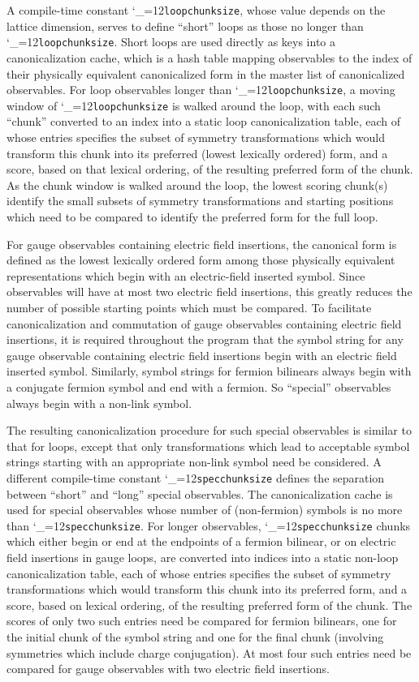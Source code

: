 \documentclass [12pt]{article}
\makeatletter
\renewcommand{\tt}{\begingroup\catcode`_=12\def\_{\string_}\tt@}
\newcommand{\tt@}[1]{\texttt{#1}\endgroup}
\makeatother
\begin{document}
A compile-time constant \tt{loopchunksize},
whose value depends on the lattice dimension,
serves to define ``short'' loops as those no longer
than \tt{loopchunksize}.
Short loops are used directly as keys into
a canonicalization cache, which is a hash
table mapping observables to the index
of their physically equivalent canonicalized
form in the master list of canonicalized observables.
For loop observables longer than \tt{loopchunksize},
a moving window of \tt{loopchunksize} is walked around
the loop, with each such ``chunk'' converted to an
index into a static loop canonicalization table,
each of whose entries specifies the subset of
symmetry transformations which would transform
this chunk into its preferred (lowest lexically ordered)
form, and a score, based on that lexical ordering, of
the resulting preferred form of the chunk.
As the chunk window is walked around the loop,
the lowest scoring chunk(s) identify the 
small subsets of symmetry transformations
and starting positions which
need to be compared to identify the preferred
form for the full loop.

For gauge observables containing electric field insertions,
the canonical form is defined as the lowest
lexically ordered form among those physically equivalent
representations which begin with an electric-field
inserted symbol.
Since observables will have at most two electric field insertions,
this greatly reduces the number of possible starting points
which must be compared.
To facilitate canonicalization and commutation of
gauge observables containing electric field insertions,
it is required throughout the program that the
symbol string for any gauge observable containing electric
field insertions begin with an electric field inserted symbol.
Similarly, symbol strings for fermion bilinears always
begin with a conjugate fermion symbol and end with a fermion.
So ``special'' observables always begin with a non-link symbol.

The resulting canonicalization procedure for such special observables
is similar to that for loops, except that only transformations which
lead to acceptable symbol strings starting with an appropriate non-link
symbol need be considered.
A different compile-time constant \tt{specchunksize} defines
the separation between ``short'' and ``long'' special observables.
The canonicalization cache is used for special observables whose
number of (non-fermion) symbols is no more than \tt{specchunksize}.
For longer observables, \tt{specchunksize} chunks
which either begin or end at the endpoints of a fermion bilinear,
or on electric field insertions in gauge loops,
are converted into indices into a static non-loop canonicalization
table, each of whose entries specifies the subset of
symmetry transformations which would transform
this chunk into its preferred form, and a score,
based on lexical ordering, of the resulting preferred form of the chunk.
The scores of only two such entries need be compared
for fermion bilinears, one for the initial chunk of the symbol string
and one for the final chunk (involving symmetries which
include charge conjugation).
At most four such entries need be compared for
gauge observables with two electric field insertions.
\end{document}
